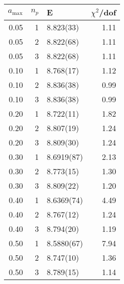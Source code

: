 \begin{tabular}{rrlr}
\hline
   $a_\textrm{max}$ &   $n_p$ & E          &   $\chi^2$/dof \\
\hline
               0.05 &       1 & 8.823(33)  &           1.11 \\
               0.05 &       2 & 8.822(68)  &           1.11 \\
               0.05 &       3 & 8.822(68)  &           1.11 \\
               0.10 &       1 & 8.768(17)  &           1.12 \\
               0.10 &       2 & 8.836(38)  &           0.99 \\
               0.10 &       3 & 8.836(38)  &           0.99 \\
               0.20 &       1 & 8.722(11)  &           1.82 \\
               0.20 &       2 & 8.807(19)  &           1.24 \\
               0.20 &       3 & 8.809(30)  &           1.24 \\
               0.30 &       1 & 8.6919(87) &           2.13 \\
               0.30 &       2 & 8.773(15)  &           1.30 \\
               0.30 &       3 & 8.809(22)  &           1.20 \\
               0.40 &       1 & 8.6369(74) &           4.49 \\
               0.40 &       2 & 8.767(12)  &           1.24 \\
               0.40 &       3 & 8.794(20)  &           1.19 \\
               0.50 &       1 & 8.5880(67) &           7.94 \\
               0.50 &       2 & 8.747(10)  &           1.36 \\
               0.50 &       3 & 8.789(15)  &           1.14 \\
\hline
\end{tabular}
